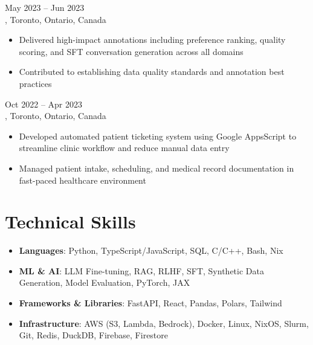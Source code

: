 \documentclass[letterpaper,10pt]{article}
\begin{document}
\hspace{0.15in}{\large\bfseries Data Quality Specialist} \hfill {\small May 2023 -- Jun 2023} \\
\hspace{0.15in}{\bfseries Cohere}, Toronto, Ontario, Canada
\vspace{-1pt}
\begin{itemize}[leftmargin=0.35in, itemsep=-1pt, topsep=1pt, labelsep=0.035in]
\item Delivered high-impact annotations including preference ranking, quality scoring, and SFT conversation generation across all domains
\item Contributed to establishing data quality standards and annotation best practices
\end{itemize}
\vspace{1pt}

\hspace{0.15in}{\large\bfseries Medical Assistant} \hfill {\small Oct 2022 -- Apr 2023} \\
\hspace{0.15in}{\bfseries P\&A Medical}, Toronto, Ontario, Canada
\vspace{-1pt}
\begin{itemize}[leftmargin=0.35in, itemsep=-1pt, topsep=1pt, labelsep=0.035in]
\item Developed automated patient ticketing system using Google AppsScript to streamline clinic workflow and reduce manual data entry
\item Managed patient intake, scheduling, and medical record documentation in fast-paced healthcare environment
\end{itemize}
\vspace{1pt}

\section{Technical Skills}

\vspace{-2pt}
\begin{itemize}[leftmargin=0.35in, itemsep=1pt, topsep=1pt, labelsep=0.035in]
\item \textbf{Languages}: Python, TypeScript/JavaScript, SQL, C/C++, Bash, Nix
\item \textbf{ML \& AI}: LLM Fine-tuning, RAG, RLHF, SFT, Synthetic Data Generation, Model Evaluation, PyTorch, JAX
\item \textbf{Frameworks \& Libraries}: FastAPI, React, Pandas, Polars, Tailwind
\item \textbf{Infrastructure}: AWS (S3, Lambda, Bedrock), Docker, Linux, NixOS, Slurm, Git, Redis, DuckDB, Firebase, Firestore
\end{itemize}
\end{document}
